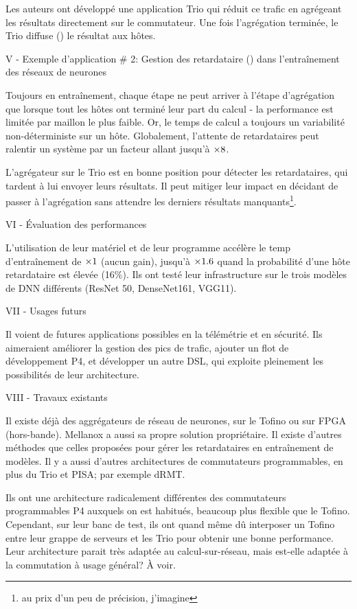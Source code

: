 Les auteurs ont développé une application Trio qui réduit ce trafic en agrégeant les résultats directement sur le commutateur. Une fois l’agrégation terminée, le Trio diffuse () le résultat aux hôtes.

V - Exemple d'application \# 2: Gestion des retardataire () dans l'entraînement des réseaux de neurones

Toujours en entraînement, chaque étape ne peut arriver à l'étape d’agrégation que lorsque tout les hôtes ont terminé leur part du calcul - la performance est limitée par maillon le plus faible. Or, le temps de calcul a toujours un variabilité non-déterministe sur un hôte. Globalement, l'attente de retardataires peut ralentir un système par un facteur allant jusqu'à $\times8$.

L’agrégateur sur le Trio est en bonne position pour détecter les retardataires, qui tardent à lui envoyer leurs résultats. Il peut mitiger leur impact en décidant de passer à l'agrégation sans attendre les derniers résultats manquants\footnote{au prix d'un peu de précision, j'imagine}.

VI - Évaluation des performances

L'utilisation de leur matériel et de leur programme accélère le temp d'entraînement de $\times 1$ (aucun gain), jusqu'à $\times 1.6$ quand la probabilité d'une hôte retardataire est élevée (16\%). Ils ont testé leur infrastructure sur le trois modèles de DNN différents (ResNet 50, DenseNet161, VGG11).

VII - Usages futurs

Il voient de futures applications possibles en la télémétrie et en sécurité. Ils aimeraient améliorer la gestion des pics de trafic, ajouter un flot de développement P4, et développer un autre DSL, qui exploite pleinement les possibilités de leur architecture.

VIII - Travaux existants

Il existe déjà des aggrégateurs de réseau de neurones, sur le Tofino ou sur FPGA (hors-bande). Mellanox a aussi sa propre solution propriétaire. Il existe d'autres méthodes que celles proposées pour gérer les retardataires en entraînement de modèles. Il y a aussi d'autres architectures de commutateurs programmables, en plus du Trio et PISA; par exemple dRMT.

 Ils ont une architecture radicalement différentes des commutateurs programmables P4 auxquels on est habitués, beaucoup plus flexible que le Tofino. Cependant, sur leur banc de test, ils ont quand même dû interposer un Tofino entre leur grappe de serveurs et les Trio pour obtenir une bonne performance. Leur architecture parait très adaptée au calcul-sur-réseau, mais est-elle adaptée à la commutation à usage général? À voir.


\clearpage
